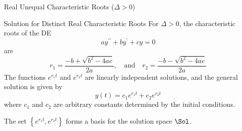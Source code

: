 \documentclass{beamer}
\begin{document}
\begin{frame}{Real Unequal Characteristic Roots ($\Delta>0$)}
\begin{block}{Solution for Distinct Real Characteristic Roots}
For $\Delta>0$, the characteristic roots of the DE
\begin{equation*}
ay^{\prime\prime}+by^{\prime}+cy=0
\end{equation*}
are
\begin{equation*}
r_1=\dfrac{-b+\sqrt{b^2-4ac}}{2a}
,\quad\text{and}\quad
r_2=\dfrac{-b-\sqrt{b^2-4ac}}{2a}
\end{equation*}\pause
The functions $e^{r_1t}$ and $e^{r_2t}$ are linearly independent solutions, and the general solution is given by
\begin{equation*}
y(t)=c_1e^{r_1t}+c_2e^{r_2t}
\end{equation*}
where $c_1$ and $c_2$ are arbitrary constants determined by the initial conditions.\pause

The set $\left\{e^{r_1t},e^{r_2t}\right\}$ forms a basis for the solution space $\Sol$.
\end{block}
\end{frame}
\end{document}
